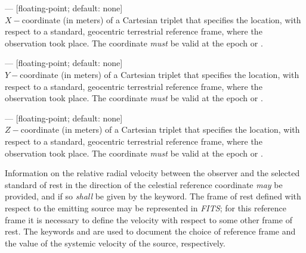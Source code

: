 \documentclass[11pt,makeidx]{book}     %
\begin{document}
\begin{description}

\item {} --- [floating-point; default: none]\\ $X-$coordinate (in meters) of a
Cartesian triplet that specifies the location, with respect to a standard, geocentric
terrestrial reference frame, where the observation took place. The coordinate \emph{must} be
valid at the epoch  or .

\item {} --- [floating-point; default: none]\\ $Y-$coordinate (in meters) of a
Cartesian triplet that specifies the location, with respect to a standard, geocentric
terrestrial reference frame, where the observation took place. The coordinate \emph{must} be
valid at the epoch  or .

\item {} --- [floating-point; default: none]\\ $Z-$coordinate (in meters) of a
Cartesian triplet that specifies the location, with respect to a standard, geocentric
terrestrial reference frame, where the observation took place. The coordinate \emph{must} be
valid at the epoch  or .

\end{description}

Information on the relative radial velocity between the observer and the selected standard of
rest in the direction of the celestial reference coordinate \emph{may} be provided, and if so
\emph{shall} be given by the  keyword.
The frame of rest defined with respect to the emitting source may be represented in {\em FITS\/}; for
this reference frame it is necessary to define the velocity with respect to some other frame
of rest. The keywords  and  are used to document the choice
of reference frame and the value of the systemic velocity of the source, respectively.
\end{document}
